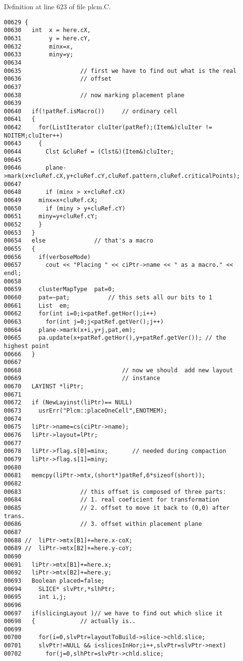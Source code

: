 Definition at line 623 of file plcm.C.\small\begin{verbatim}00629 {
00630   int  x = here.cX,
00631        y = here.cY,
00632        minx=x,
00633        miny=y;
00634 
00635                 // first we have to find out what is the real
00636                 // offset
00637 
00638                 // now marking placement plane
00639 
00640   if(!patRef.isMacro())     // ordinary cell
00641   {
00642     for(ListIterator cluIter(patRef);(Item&)cluIter != NOITEM;cluIter++)
00643     {
00644       Clst &cluRef = (Clst&)(Item&)cluIter;
00645       
00646       plane->mark(x+cluRef.cX,y+cluRef.cY,cluRef.pattern,cluRef.criticalPoints);
00647       
00648       if (minx > x+cluRef.cX)
00649     minx=x+cluRef.cX;
00650       if (miny > y+cluRef.cY)
00651     miny=y+cluRef.cY;
00652     }
00653   }
00654   else              // that's a macro
00655   {
00656     if(verboseMode)
00657       cout << "Placing " << ciPtr->name << " as a macro." << endl;
00658 
00659     clusterMapType  pat=0;
00660     pat=~pat;           // this sets all our bits to 1
00661     List  em;
00662     for(int i=0;i<patRef.getHor();i++)
00663       for(int j=0;j<patRef.getVer();j++)
00664     plane->mark(x+i,y+j,pat,em);    
00665     pa.update(x+patRef.getHor(),y+patRef.getVer()); // the highest point
00666   }
00667     
00668                             // now we should  add new layout
00669                             // instance
00670   LAYINST *liPtr;
00671 
00672   if (NewLayinst(liPtr)== NULL)
00673     usrErr("Plcm::placeOneCell",ENOTMEM);
00674 
00675   liPtr->name=cs(ciPtr->name);
00676   liPtr->layout=lPtr;
00677 
00678   liPtr->flag.s[0]=minx;       // needed during compaction
00679   liPtr->flag.s[1]=miny;
00680 
00681   memcpy(liPtr->mtx,(short*)patRef,6*sizeof(short));
00682 
00683                 // this offset is composed of three parts:
00684                 // 1. real coeficient for transformation
00685                 // 2. offset to move it back to (0,0) after trans.
00686                 // 3. offset within placement plane
00687 
00688 //  liPtr->mtx[B1]+=here.x-coX;
00689 //  liPtr->mtx[B2]+=here.y-coY;
00690 
00691   liPtr->mtx[B1]+=here.x;
00692   liPtr->mtx[B2]+=here.y;
00693   Boolean placed=false;
00694     SLICE* slvPtr,*slhPtr;
00695     int i,j;
00696 
00697   if(slicingLayout )// we have to find out which slice it
00698   {             // actually is..
00699     
00700     for(i=0,slvPtr=layoutToBuild->slice->chld.slice;
00701     slvPtr!=NULL && i<slicesInHor;i++,slvPtr=slvPtr->next)
00702       for(j=0,slhPtr=slvPtr->chld.slice;

\end{verbatim}
